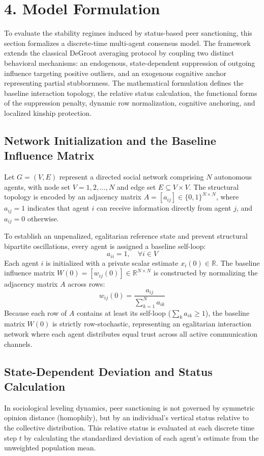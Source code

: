 \section{4. Model Formulation}
To evaluate the stability regimes induced by status-based peer sanctioning, this section formalizes a discrete-time multi-agent consensus model\cite{degroot1974reaching}. The framework extends the classical DeGroot averaging protocol by coupling two distinct behavioral mechanisms: an endogenous, state-dependent suppression of outgoing influence targeting positive outliers, and an exogenous cognitive anchor representing partial stubbornness\cite{degroot1974reaching}. The mathematical formulation defines the baseline interaction topology, the relative status calculation, the functional forms of the suppression penalty, dynamic row normalization, cognitive anchoring, and localized kinship protection\cite{degroot1974reaching}.

\subsection{Network Initialization and the Baseline Influence Matrix}
Let $G = (V, E)$ represent a directed social network comprising $N$ autonomous agents, with node set $V = {1, 2, \dots, N}$ and edge set $E \subseteq V \times V$\cite{degroot1974reaching}. The structural topology is encoded by an adjacency matrix $A = [a_{ij}] \in \{0,1\}^{N \times N}$, where $a_{ij} = 1$ indicates that agent $i$ can receive information directly from agent $j$, and $a_{ij} = 0$ otherwise\cite{degroot1974reaching}.

To establish an unpenalized, egalitarian reference state and prevent structural bipartite oscillations, every agent is assigned a baseline self-loop: $$a_{ii} = 1, \quad \forall i \in V$$ Each agent $i$ is initialized with a private scalar estimate $x_i(0) \in \mathbb{R}$\cite{degroot1974reaching}. The baseline influence matrix $W(0) = [w_{ij}(0)] \in \mathbb{R}^{N \times N}$ is constructed by normalizing the adjacency matrix $A$ across rows\cite{degroot1974reaching}: $$w_{ij}(0) = \frac{a_{ij}}{\sum_{k=1}^N a_{ik}}$$ Because each row of $A$ contains at least its self-loop ($\sum_k a_{ik} \ge 1$), the baseline matrix $W(0)$ is strictly row-stochastic, representing an egalitarian interaction network where each agent distributes equal trust across all active communication channels\cite{degroot1974reaching}.

\subsection{State-Dependent Deviation and Status Calculation}
In sociological leveling dynamics, peer sanctioning is not governed by symmetric opinion distance (homophily), but by an individual's vertical status relative to the collective distribution\cite{degroot1974reaching}. This relative status is evaluated at each discrete time step $t$ by calculating the standardized deviation of each agent's estimate from the unweighted population mean\cite{degroot1974reaching}.

